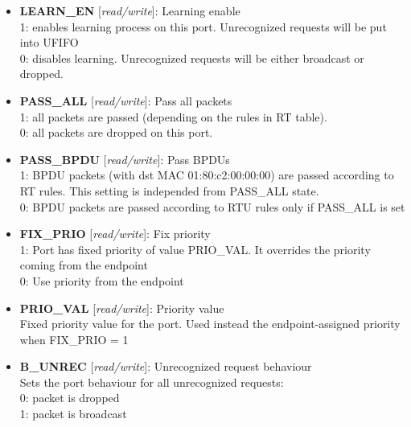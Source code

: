 \begin{itemize}
\item \begin{small}
{\bf 
LEARN\_EN
} [\emph{read/write}]: Learning enable
\\
1: enables learning process on this port. Unrecognized requests will be put into UFIFO\\         0: disables learning. Unrecognized requests will be either broadcast or dropped.
\end{small}
\item \begin{small}
{\bf 
PASS\_ALL
} [\emph{read/write}]: Pass all packets
\\
1: all packets are passed (depending on the rules in RT table). \\         0: all packets are dropped on this port.
\end{small}
\item \begin{small}
{\bf 
PASS\_BPDU
} [\emph{read/write}]: Pass BPDUs
\\
1: BPDU packets (with dst MAC 01:80:c2:00:00:00) are passed according to RT rules. This setting is independed from PASS\_ALL state.\\         0: BPDU packets are passed according to RTU rules only if PASS\_ALL is set
\end{small}
\item \begin{small}
{\bf 
FIX\_PRIO
} [\emph{read/write}]: Fix priority
\\
1: Port has fixed priority of value PRIO\_VAL. It overrides the priority coming from the endpoint\\         0: Use priority from the endpoint
\end{small}
\item \begin{small}
{\bf 
PRIO\_VAL
} [\emph{read/write}]: Priority value
\\
Fixed priority value for the port. Used instead the endpoint-assigned priority when FIX\_PRIO = 1
\end{small}
\item \begin{small}
{\bf 
B\_UNREC
} [\emph{read/write}]: Unrecognized request behaviour
\\
Sets the port behaviour for all unrecognized requests:\\         0: packet is dropped\\         1: packet is broadcast
\end{small}
\end{itemize}
